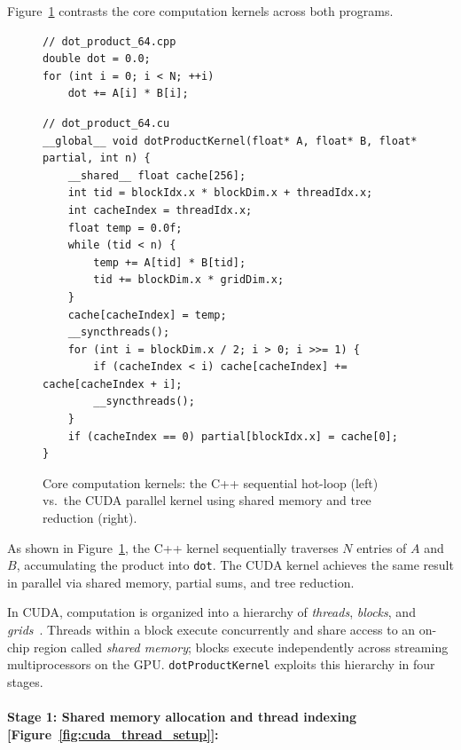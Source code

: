 \documentclass{article}
\begin{document}
Figure~\ref{fig:dot_product_kernels} contrasts the core computation kernels across both programs.

\begin{figure}[H]
\noindent%
\begin{minipage}[t]{0.48\textwidth}
\begin{verbatim}
// dot_product_64.cpp
double dot = 0.0;
for (int i = 0; i < N; ++i)
    dot += A[i] * B[i];
\end{verbatim}
\end{minipage}%
\hfill%
\begin{minipage}[t]{0.48\textwidth}
\begin{verbatim}
// dot_product_64.cu
__global__ void dotProductKernel(float* A, float* B, float* partial, int n) {
    __shared__ float cache[256];
    int tid = blockIdx.x * blockDim.x + threadIdx.x;
    int cacheIndex = threadIdx.x;
    float temp = 0.0f;
    while (tid < n) {
        temp += A[tid] * B[tid];
        tid += blockDim.x * gridDim.x;
    }
    cache[cacheIndex] = temp;
    __syncthreads();
    for (int i = blockDim.x / 2; i > 0; i >>= 1) {
        if (cacheIndex < i) cache[cacheIndex] += cache[cacheIndex + i];
        __syncthreads();
    }
    if (cacheIndex == 0) partial[blockIdx.x] = cache[0];
}
\end{verbatim}
\end{minipage}
    \caption{Core computation kernels: the C++ sequential hot-loop (left) vs.\ the CUDA parallel kernel using shared memory and tree reduction (right).}
    \label{fig:dot_product_kernels}
\end{figure}

As shown in Figure~\ref{fig:dot_product_kernels}, the C++ kernel sequentially traverses $N$ entries of $A$ and $B$, accumulating the product into \texttt{dot}. The CUDA kernel achieves the same result in parallel via shared memory, partial sums, and tree reduction.

In CUDA, computation is organized into a hierarchy of \emph{threads}, \emph{blocks}, and \emph{grids}~\cite{kirk2010programming}. Threads within a block execute concurrently and share access to an on-chip region called \emph{shared memory}; blocks execute independently across streaming multiprocessors on the GPU. \texttt{dotProductKernel} exploits this hierarchy in four stages.

\paragraph{Stage 1: Shared memory allocation and thread indexing [Figure~\ref{fig:cuda_thread_setup}]:}
\end{document}

